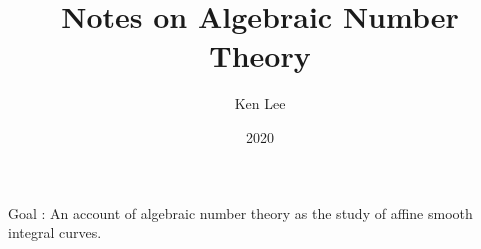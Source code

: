 \documentclass{article}
\begin{document}
\title{Notes on Algebraic Number Theory}

\author{Ken Lee}
\date{2020}
\maketitle


Goal : An account of algebraic number theory as 
the study of affine smooth integral curves. 
\end{document}
